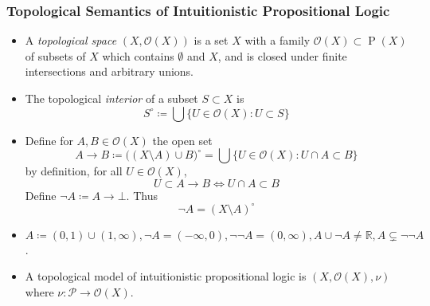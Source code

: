 \documentclass[UTF8,11pt,colorlinks,compress,openany]{beamer}%
\begin{document}
\begin{frame}\frametitle{Topological Semantics of Intuitionistic Propositional Logic}
\begin{itemize}
	\item A \emph{topological space} $(X,\mathcal{O}(X))$ is a set $X$ with a family $\mathcal{O}(X)\subset\operatorname{P}(X)$ of subsets of $X$ which contains $\emptyset$ and $X$, and is closed under finite intersections and arbitrary unions.
	\item The topological \emph{interior} of a subset $S\subset X$ is
	\[S^\circ\coloneqq \bigcup\big\{U\in\mathcal{O}(X): U\subset S\big\}\]
	\item Define for $A,B\in\mathcal{O}(X)$ the open set
	\[A\to B \coloneqq \big((X\setminus A)\cup B\big)^\circ=\bigcup\big\{U\in\mathcal{O}(X):U\cap A\subset B\big\}\]
	by definition, for all $U\in\mathcal{O}(X)$,
	\[U\subset A\to B\iff U\cap A\subset B\]
	Define $\neg A\coloneqq A\to\bot$. Thus
	\[\neg A=(X\setminus A)^\circ\]
	\item $A\coloneqq (0,1)\cup(1,\infty), \neg A=(-\infty,0), \neg\neg A=(0,\infty), A\cup\neg A\ne\mathbb{R}, A\subsetneq\neg\neg A$.
	\item A topological model of intuitionistic propositional logic is $(X,\mathcal{O}(X),\nu)$ where $\nu:\mathcal{P}\to\mathcal{O}(X)$.
\end{itemize}
\end{frame}
\end{document}
